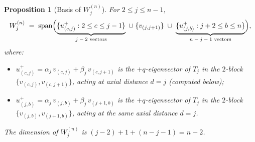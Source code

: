 \documentclass[11pt]{article}
\newtheorem{proposition}[theorem]{Proposition}
\theoremstyle{definition}
\begin{document}
\begin{proposition}[Basis of $W_j^{(n)}$]\label{prop:Wj}
For $2\le j\le n-1$,
\begin{equation}\label{eq:Wj-basis}
   W_j^{(n)} \;=\;
   \mathrm{span}\Bigl(
     \underbrace{\{u^+_{(c,j)} : 2\le c\le j-1\}}_{\text{$j-2$ vectors}}
     \;\cup\;\{v_{(j,j+1)}\}\;\cup\;
     \underbrace{\{u^+_{(j,b)} : j+2\le b\le n\}}_{\text{$n-j-1$ vectors}}
   \Bigr),
\end{equation}
where:
\begin{itemize}[leftmargin=2em,topsep=0.3em,itemsep=0.2em]
\item $u^+_{(c,j)} = \alpha_j\,v_{(c,j)} + \beta_j\,v_{(c,j+1)}$ is the
$+q$-eigenvector of $T_j$ in the $2$-block $\{v_{(c,j)}, v_{(c,j+1)}\}$,
acting at axial distance $d=j$ (computed below);
\item $u^+_{(j,b)} = \alpha_j\,v_{(j,b)} + \beta_j\,v_{(j+1,b)}$ is the
$+q$-eigenvector of $T_j$ in the $2$-block $\{v_{(j,b)}, v_{(j+1,b)}\}$,
acting at the same axial distance $d=j$.
\end{itemize}
The dimension of $W_j^{(n)}$ is $(j-2)+1+(n-j-1)=n-2$.
\end{proposition}
\end{document}
